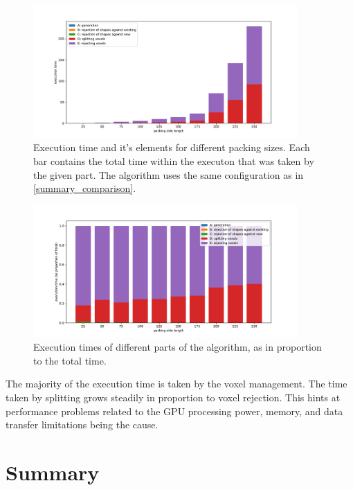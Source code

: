 \documentclass[12pt, oneside]{report}
\begin{document}
\begin{figure}[H]
  \centering
	\label{summary_times_total}
	\includegraphics[width=0.9\textwidth,keepaspectratio]{Images/SummaryComparison/parts_total.pdf}
	\caption{Execution time and it's elements for different packing sizes. Each bar contains the total time within the executon that was taken by the given part. The algorithm uses the same configuration as in \ref{summary_comparison}. }
\end{figure}

\begin{figure}[H]
  \centering
	\label{summary_times_proportional}
	\includegraphics[width=0.9\textwidth,keepaspectratio]{Images/SummaryComparison/parts_proportional.pdf}
	\caption{Execution times of different parts of the algorithm, as in proportion to the total time.}
\end{figure}

The majority of the execution time is taken by the voxel management. The time taken by splitting grows steadily in proportion to voxel rejection. This hints at performance problems related to the GPU processing power, memory, and data transfer limitations being the cause.


\section{Summary}
\end{document}
